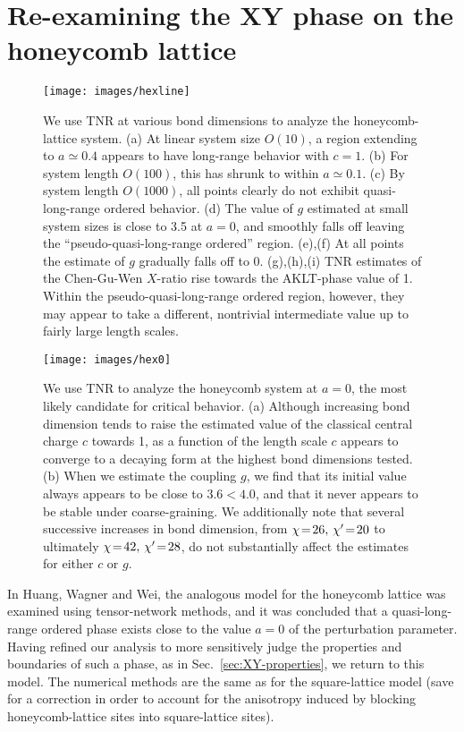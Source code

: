\documentclass[aps,prb,letterpaper,superscriptaddress,twocolumn,showpacs,floatfix,10pt]{revtex4-1}
\begin{document}
\section{Re-examining the XY phase on the honeycomb lattice}
\label{sec:honeycomb}

\begin{figure}[h!]
\texttt{[image: images/hexline]}
\caption{We use TNR at various bond dimensions to analyze the honeycomb-lattice
system.
(a) At linear system size $O(10)$, a region extending to $a \simeq 0.4$ appears
to have long-range behavior with $c=1$.
(b) For system length $O(100)$, this has shrunk to
within $a \simeq 0.1$. (c) By system length $O(1000)$, all points clearly do
not exhibit quasi-long-range ordered behavior.
(d) The value of $g$ estimated at small system sizes is close to 3.5 at
$a=0$, and smoothly falls off leaving the ``pseudo-quasi-long-range ordered''
region. (e),(f) At all points the estimate of $g$ gradually falls off to 0.
(g),(h),(i) TNR estimates of the Chen-Gu-Wen $X$-ratio \cite{ChenGuWen} rise towards
the AKLT-phase value of 1. Within the pseudo-quasi-long-range ordered region,
however, they may appear to take a different, nontrivial intermediate value 
up to fairly large length scales.}
\label{fig:hexregion}
\end{figure}

\begin{figure}[h!]
\texttt{[image: images/hex0]}
\caption{We use TNR to analyze the honeycomb system at $a=0$, the most likely
candidate for critical behavior.
(a) Although increasing bond dimension tends to raise the estimated
value of the classical central charge $c$ towards 1, as a function of
the length scale $c$ appears to converge to
a decaying form at the highest bond dimensions tested.
(b) When we estimate the coupling $g$, we find that its initial value always
appears to be close to $3.6 < 4.0$, and that it never
appears to be stable under coarse-graining.
We additionally note that several successive increases in bond dimension, from
$\chi\nobreak\!=\nobreak\!26, \,\chi'\nobreak\!=\nobreak\!20$ to ultimately $\chi\nobreak\!=\nobreak\!42, \,\chi'\nobreak\!=\nobreak\!28$,
do not substantially affect the estimates for either $c$ or $g$.
}
\label{fig:hexpoint}
\end{figure}
In Huang, Wagner and Wei\cite{AKLTspin32}, the analogous model for the
honeycomb lattice was
examined using tensor-network methods, and it was concluded that a
quasi-long-range ordered phase 
exists close to the value $a=0$ of the perturbation parameter.
Having refined our analysis to more sensitively
judge the properties and boundaries of such a phase, as in
Sec.~\ref{sec:XY-properties}, we return to
this model. The numerical methods are the same as for the
square-lattice model (save for a
correction in order to account for the anisotropy induced by blocking
honeycomb-lattice sites into square-lattice sites).
\end{document}
